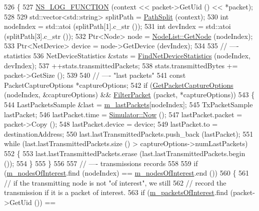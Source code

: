 \begin{DoxyCode}
526 \{
527   \hyperlink{log-macros-disabled_8h_a90b90d5bad1f39cb1b64923ea94c0761}{NS\_LOG\_FUNCTION} (context << packet->GetUid () << *packet);
528 
529   std::vector<std::string> splitPath = \hyperlink{pyviz_8cc_abfaec39467cd62b64fb7727503d04d44}{PathSplit} (context);
530   \textcolor{keywordtype}{int} nodeIndex = std::atoi (splitPath[1].c\_str ());
531   \textcolor{keywordtype}{int} devIndex = std::atoi (splitPath[3].c\_str ());
532   Ptr<Node> node = \hyperlink{classns3_1_1NodeList_a80ac09977d48d29db5c704ac8483cf6c}{NodeList::GetNode} (nodeIndex);
533   Ptr<NetDevice> device = node->GetDevice (devIndex);
534 
535   \textcolor{comment}{// ---- statistics}
536   NetDeviceStatistics &stats = \hyperlink{classns3_1_1PyViz_ac86a6ebd5f988fa103787f3fe9d09113}{FindNetDeviceStatistics} (nodeIndex, devIndex);
537   ++stats.transmittedPackets;
538   stats.transmittedBytes += packet->GetSize ();
539 
540   \textcolor{comment}{// ---- "last packets"}
541   \textcolor{keyword}{const} PacketCaptureOptions *captureOptions;
542   \textcolor{keywordflow}{if} (\hyperlink{classns3_1_1PyViz_ae78d7025e4dc17203d654789bc9aa829}{GetPacketCaptureOptions} (nodeIndex, &captureOptions) && 
      \hyperlink{classns3_1_1PyViz_ad92f800fa5f75fc22531f572fe38095d}{FilterPacket} (packet, *captureOptions))
543     \{
544       LastPacketsSample &last = \hyperlink{classns3_1_1PyViz_a55366b9119e42eaa283e43b6bc51c464}{m\_lastPackets}[nodeIndex];
545       TxPacketSample lastPacket;
546       lastPacket.time = \hyperlink{classns3_1_1Simulator_ac3178fa975b419f7875e7105be122800}{Simulator::Now} ();
547       lastPacket.packet = packet->Copy ();
548       lastPacket.device = device;
549       lastPacket.to = destinationAddress;
550       last.lastTransmittedPackets.push\_back (lastPacket);
551       \textcolor{keywordflow}{while} (last.lastTransmittedPackets.size () > captureOptions->numLastPackets)
552         \{
553           last.lastTransmittedPackets.erase (last.lastTransmittedPackets.begin ());
554         \}
555     \}
556 
557   \textcolor{comment}{// ---- transmissions records}
558 
559   \textcolor{keywordflow}{if} (\hyperlink{classns3_1_1PyViz_a84239071f012e9f0b3d16c11076f4d63}{m\_nodesOfInterest}.find (nodeIndex) == \hyperlink{classns3_1_1PyViz_a84239071f012e9f0b3d16c11076f4d63}{m\_nodesOfInterest}.end ())
560     \{
561       \textcolor{comment}{// if the transmitting node is not "of interest", we still}
562       \textcolor{comment}{// record the transmission if it is a packet of interest.}
563       \textcolor{keywordflow}{if} (\hyperlink{classns3_1_1PyViz_af922cc7db7145889b2e518e568eac467}{m\_packetsOfInterest}.find (packet->GetUid ()) == 

\end{DoxyCode}
